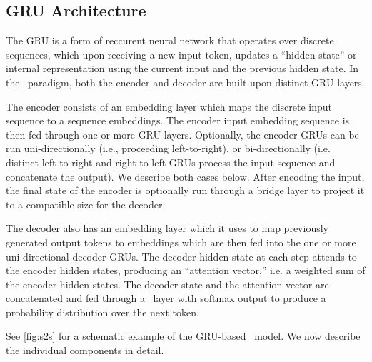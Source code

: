 \subsection{GRU Architecture}



The GRU is a form of reccurent neural network \citep{elman1990} that operates over discrete 
sequences, which upon receiving a new input token, updates a ``hidden state'' 
or internal representation using the current
input and the previous hidden state. In the \sequencetosequence~paradigm,
both the encoder and decoder are built upon distinct GRU layers. 

The encoder consists of an embedding layer which maps the discrete input
sequence to a sequence embeddings. The encoder input embedding sequence 
is then fed through one or more GRU layers. Optionally, the encoder GRUs
can be run uni-directionally (i.e., proceeding left-to-right), or bi-directionally (i.e. distinct left-to-right and right-to-left 
GRUs process the input sequence and concatenate the output). We describe 
both cases below. After encoding the input, the final state of the encoder 
is optionally run through a bridge layer to project it to a compatible size
for the decoder. 

The decoder also has an embedding layer which it uses to map previously
generated output tokens to embeddings which are then fed into the 
one or more uni-directional decoder GRUs. The decoder hidden state at 
each step attends to the encoder hidden states, producing an ``attention vector,'' i.e. a weighted sum of the encoder hidden states. The decoder state
and the attention vector are concatenated and fed through a \feedforward~layer
with softmax output to produce a probability distribution over the next
token. 

See \autoref{fig:s2s} for a schematic example of the GRU-based
\sequencetosequence~model. We now describe the individual components in 
detail.

